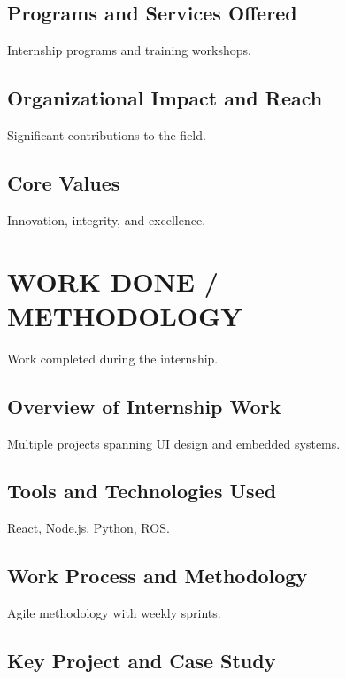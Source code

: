 \documentclass[12pt,a4paper]{report}
\begin{document}
\section{Programs and Services Offered}

Internship programs and training workshops.


\section{Organizational Impact and Reach}

Significant contributions to the field.


\section{Core Values}

Innovation, integrity, and excellence.




\chapter{WORK DONE / METHODOLOGY}
\label{ch:work}


Work completed during the internship.


\section{Overview of Internship Work}

Multiple projects spanning UI design and embedded systems.


\section{Tools and Technologies Used}

React, Node.js, Python, ROS.




\section{Work Process and Methodology}

Agile methodology with weekly sprints.


\section{Key Project and Case Study}
\end{document}
